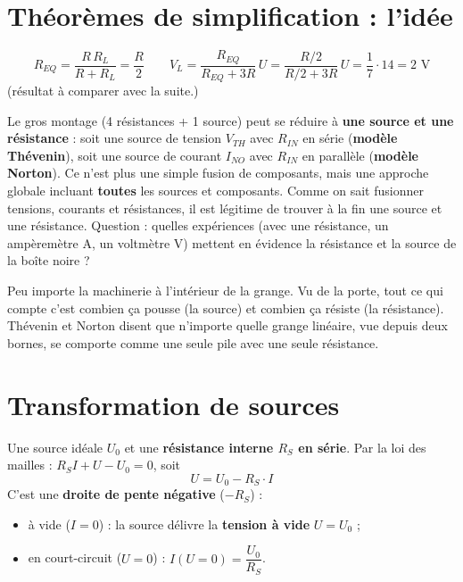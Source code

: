 \section{Théorèmes de simplification : l'idée}


\begin{exbox}[title={Expérience 2, A.N. : $R = R_L = 1$\,k$\Omega$, $U = 14$\,V}]
\[ R_{EQ} = \frac{R\,R_L}{R + R_L} = \frac R2 \qquad
   V_L = \frac{R_{EQ}}{R_{EQ} + 3R}\,U = \frac{R/2}{R/2 + 3R}\,U = \frac17\cdot 14 = 2\text{ V} \]
(résultat à comparer avec la suite.)
\end{exbox}

Le gros montage (4 résistances + 1 source) peut se réduire à \textbf{une source et une
résistance} : soit une source de tension $V_{TH}$ avec $R_{IN}$ en série (\textbf{modèle
Thévenin}), soit une source de courant $I_{NO}$ avec $R_{IN}$ en parallèle (\textbf{modèle
Norton}). Ce n'est plus une simple fusion de composants, mais une approche globale incluant
\textbf{toutes} les sources et composants. Comme on sait fusionner tensions, courants et
résistances, il est légitime de trouver à la fin une source et une résistance. Question :
quelles expériences (avec une résistance, un ampèremètre A, un voltmètre V) mettent en
évidence la résistance et la source de la boîte noire ?

\begin{goatbox}
Peu importe la machinerie à l'intérieur de la grange. Vu de la porte, tout ce qui compte
c'est \og combien ça pousse\fg{} (la source) et \og combien ça résiste\fg{} (la résistance).
Thévenin et Norton disent que n'importe quelle grange linéaire, vue depuis deux bornes, se
comporte comme une seule pile avec une seule résistance.
\end{goatbox}

\section{Transformation de sources}


\begin{defnbox}[title={Source linéaire de tension}]
Une source idéale $U_0$ et une \textbf{résistance interne $R_S$ en série}. Par la loi des
mailles : $R_S I + U - U_0 = 0$, soit
\[ U = U_0 - R_S\cdot I \]
C'est une \textbf{droite de pente négative} ($-R_S$) :
\begin{itemize}
  \item à vide ($I = 0$) : la source délivre la \textbf{tension à vide} $U = U_0$ ;
  \item en court-circuit ($U = 0$) : $I(U = 0) = \dfrac{U_0}{R_S}$.
\end{itemize}
\end{defnbox}

